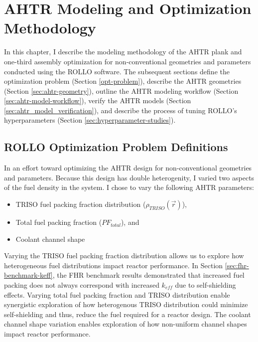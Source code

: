 \chapter{AHTR Modeling and Optimization Methodology}
\glsresetall
\label{chap:method}
In this chapter, I describe the modeling methodology of the 
\gls{AHTR} plank and one-third assembly optimization for non-conventional 
geometries and parameters conducted using the \gls{ROLLO} software.
The subsequent sections define the optimization problem (Section \ref{opt-problem}), 
describe the \gls{AHTR} geometries (Section \ref{sec:ahtr-geometry}), 
outline the \gls{AHTR} modeling workflow (Section \ref{sec:ahtr-model-workflow}), 
verify the \gls{AHTR} models (Section \ref{sec:ahtr_model_verification}), 
and describe the process of tuning \gls{ROLLO}'s hyperparameters (Section 
\ref{sec:hyperparameter-studies}). 

\section{ROLLO Optimization Problem Definitions}
\label{sec:opt-problem}
In an effort toward optimizing the \gls{AHTR} design for non-conventional geometries 
and parameters. Because this design has double heterogenity, I varied two aspects of 
the fuel density in the system. 
I chose to vary the following \gls{AHTR} parameters: 
\begin{itemize}
    \item \gls{TRISO} fuel packing fraction distribution ($\rho_{TRISO}(\vec{r})$),
    \item Total fuel packing fraction ($PF_{total}$), and 
    \item Coolant channel shape
\end{itemize} 
Varying the \gls{TRISO} fuel packing fraction distribution allows us to explore how 
heterogeneous fuel distributions impact reactor performance.
In Section \ref{sec:fhr-benchmark-keff}, the \gls{FHR} benchmark results demonstrated 
that increased fuel packing does not always correspond with increased $k_{eff}$ due to 
self-shielding effects. 
Varying total fuel packing fraction and TRISO distribution enable synergistic
exploration of how heterogenous TRISO distribution could minimize self-shielding and 
thus, reduce the fuel required for a reactor design. 
The coolant channel shape variation enables exploration of how non-uniform 
channel shapes impact reactor performance. 

